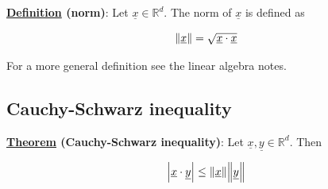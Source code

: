 \documentclass[10pt]{extarticle}
\newcommand{\R}{\mathbb{R}}
\begin{document}
\textbf{\underline{Definition} (norm)}: Let $\underline{x} \in \R^d$. The norm of $\underline{x}$ is defined as

$$
    \norm{\underline{x}} = \sqrt{\underline{x} \cdot \underline{x}}
$$

For a more general definition see the linear algebra notes.

\subsection{Cauchy-Schwarz inequality}

\textbf{\underline{Theorem} (Cauchy-Schwarz inequality)}: Let $\underline{x}, \underline{y} \in \R^d$. Then

$$
    \abs{\underline{x} \cdot \underline{y}} \leq \norm{\underline{x}} \norm{\underline{y}}
$$
\end{document}
